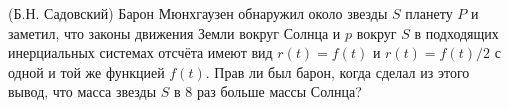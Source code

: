 (Б.Н. Садовский)
Барон Мюнхгаузен обнаружил около звезды $S$ планету $P$ и заметил, что
законы движения Земли вокруг Солнца и $p$ вокруг $S$ в подходящих
инерциальных системах отсчёта имеют вид $r(t)=f(t)$ и $r(t)=f(t)/2$ с
одной и той же функцией $f(t)$. Прав ли был барон, когда сделал из
этого вывод, что масса звезды $S$ в $8$ раз больше массы Солнца?
